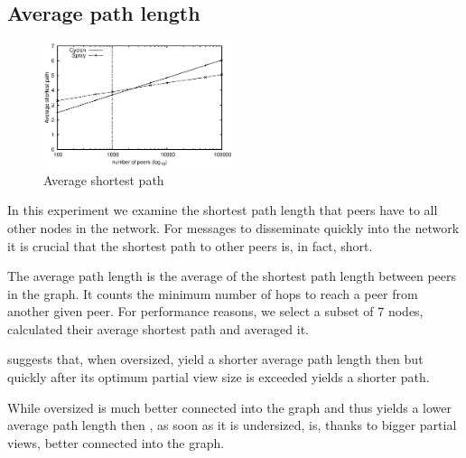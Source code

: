 \subsection{Average path length}

\begin{figure}
    \centering
    \includegraphics[width=0.49\textwidth]{img/avgpath.eps}
    \caption{Average shortest path}
    \label{fig:avgpath}
\end{figure}

\begin{asparadesc}
\item[Objective:]
    In this experiment we examine the shortest path length that peers have to 
    all other nodes in the network.
    For messages to disseminate quickly into the network it is crucial 
    that the shortest path to other peers is, in fact, short.
\item[Description:] 
    The average path length is the average of the shortest path
  length between peers in the graph. It counts the minimum number of hops to
  reach a peer from another given peer.
  For performance reasons, we select a subset of 7 nodes, calculated their
  average shortest path and averaged it.
\item[Results:
    Figure~\ref{fig:avgpath}] suggests that\CYCLON{}, when oversized, yield a shorter average path length then \SCAMPLON{}
    but quickly after its optimum partial view size is exceeded \SCAMPLON{} yields a shorter path.

\item[Reasons:]

    While oversized \CYCLON{} is much better connected into the graph and thus yields a lower average path 
    length then \SCAMPLON, as soon as it is undersized, \SCAMPLON{} is, thanks to bigger partial views, 
    better connected into the graph.

\end{asparadesc}

